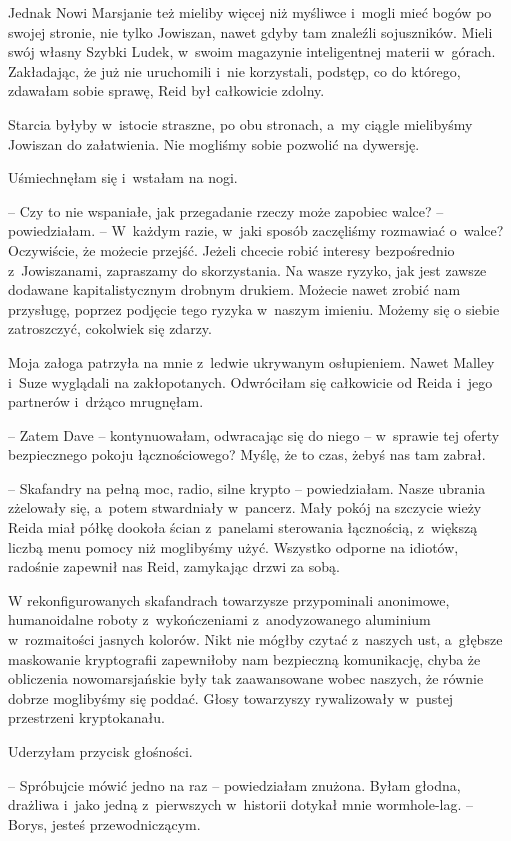 \documentclass[oneside,polish,11pt,sfheadings]{mwbk}
\begin{document}
Jednak Nowi Marsjanie też mieliby więcej niż myśliwce i~mogli mieć bogów
po swojej stronie, nie tylko Jowiszan, nawet gdyby tam znaleźli
sojuszników. Mieli swój własny Szybki Ludek, w~swoim magazynie
inteligentnej materii w~górach. Zakładając, że już nie uruchomili i~nie
korzystali, podstęp, co do którego, zdawałam sobie sprawę, Reid był
całkowicie zdolny.

Starcia byłyby w~istocie straszne, po obu stronach, a~my ciągle
mielibyśmy Jowiszan do załatwienia. Nie mogliśmy sobie pozwolić na
dywersję.

Uśmiechnęłam się i~wstałam na nogi. 

-- Czy to nie wspaniałe, jak
przegadanie rzeczy może zapobiec walce? -- powiedziałam. -- W~każdym
razie, w~jaki sposób zaczęliśmy rozmawiać o~walce? Oczywiście, że
możecie przejść. Jeżeli chcecie robić interesy bezpośrednio z~Jowiszanami, zapraszamy do skorzystania. Na wasze ryzyko, jak jest
zawsze dodawane kapitalistycznym drobnym drukiem. Możecie nawet zrobić
nam przysługę, poprzez podjęcie tego ryzyka w~naszym imieniu. Możemy się
o siebie zatroszczyć, cokolwiek się zdarzy.

Moja załoga patrzyła na mnie z~ledwie ukrywanym osłupieniem. Nawet
Malley i~Suze wyglądali na zakłopotanych. Odwróciłam się całkowicie od
Reida i~jego partnerów i~drżąco mrugnęłam.

-- Zatem Dave -- kontynuowałam, odwracając się do niego -- w~sprawie tej
oferty bezpiecznego pokoju łącznościowego? Myślę, że to czas, żebyś nas
tam zabrał.

-- Skafandry na pełną moc, radio, silne krypto -- powiedziałam. Nasze
ubrania zżelowały się, a~potem stwardniały w~pancerz. Mały pokój na
szczycie wieży Reida miał półkę dookoła ścian z~panelami sterowania
łącznością, z~większą liczbą menu pomocy niż moglibyśmy użyć. Wszystko
odporne na idiotów, radośnie zapewnił nas Reid, zamykając drzwi za sobą.

W rekonfigurowanych skafandrach towarzysze przypominali anonimowe,
humanoidalne roboty z~wykończeniami z~anodyzowanego aluminium w~rozmaitości jasnych kolorów. Nikt nie mógłby czytać z~naszych ust, a~głębsze maskowanie kryptografii zapewniłoby nam bezpieczną komunikację,
chyba że obliczenia nowomarsjańskie były tak zaawansowane wobec naszych,
że równie dobrze moglibyśmy się poddać. Głosy towarzyszy rywalizowały w~pustej przestrzeni kryptokanału.

Uderzyłam przycisk głośności. 

-- Spróbujcie mówić jedno na raz -- powiedziałam znużona. Byłam głodna, drażliwa i~jako jedną z~pierwszych w~historii dotykał mnie wormhole-lag. -- Borys, jesteś przewodniczącym.
\end{document}
